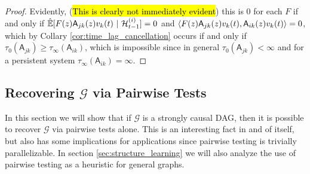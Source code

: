 \documentclass[12pt]{article}
\def\gcg{\mathcal{G}}  %
\def\A{\mathsf{A}}  %
\def\H{\mathcal{H}}  %
\newcommand{\linE}[2]{\hat{\E}[#1\ |\ #2]}  %
\begin{document}
\begin{proof}
  Evidently, (\hl{This is clearly not immediately evident}) this is
  $0$ for each $F$ if and only if
  $\linE{F(z)\A_{jk}(z)v_k(t)}{\H_{t - 1}^{(i)}} = 0$ and
  $\inner{F(z)\A_{jk}(z)v_k(t)}{\A_{ik}(z)v_k(t)} = 0$, which by
  Collary \ref{cor:time_lag_cancellation} occurs if and only if
  $\tau_0(\A_{jk}) \ge \tau_\infty(\A_{ik})$, which is impossible
  since in general $\tau_0(\A_{jk}) < \infty$ and for a persistent system
  $\tau_\infty(\A_{ik}) = \infty$.
\end{proof}

\subsection{Recovering $\gcg$ via Pairwise Tests}
\label{sec:pairwise_algorithm}
In this section we will show that if $\gcg$ is a strongly causal DAG,
then it is possible to recover $\gcg$ via pairwise tests alone.  This
is an interesting fact in and of itself, but also has some
implications for applications since pairwise testing is trivially
parallelizable.  In section \ref{sec:structure_learning} we will also
analyze the use of pairwise testing as a heuristic for general graphs.
\end{document}
